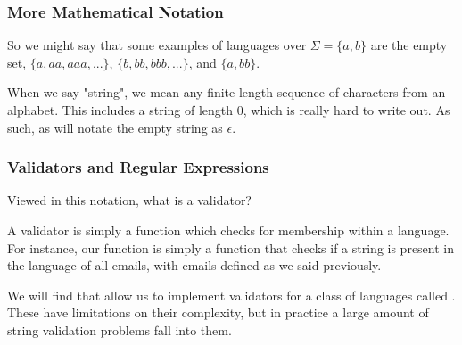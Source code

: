 \documentclass[aspectratio=169]{beamer}
\begin{document}
\begin{frame}[fragile]
  \frametitle{More Mathematical Notation}


  \pause
  \vspace{\fill}

  So we might say that some examples of languages over $\Sigma = \{a, b\}$ are
  the empty set, $\{a, aa, aaa, ...\}$, $\{b, bb, bbb, ...\}$,
  and $\{a, bb\}$.

  \pause
  \vspace{\fill}

  When we say "string", we mean any finite-length sequence of characters from
  an alphabet. This includes a string of length 0, which is really hard to
  write out. As such, as will notate the empty string as $\epsilon$.
\end{frame}

\begin{frame}[fragile]
  \frametitle{Validators and Regular Expressions}

  Viewed in this notation, what is a validator?

  \pause
  \vspace{\fill}

  A validator is simply a function which checks for membership within a
  language. For instance, our  function is simply a
  function that checks if a string is present in the language of all emails,
  with emails defined as we said previously.

  \pause
  \vspace{\fill}


  \pause
  \vspace{\fill}

  We will find that  allow us to implement
  validators for a class of languages called . These
  have limitations on their complexity, but in practice a large amount
  of string validation problems fall into them.
\end{frame}
\end{document}
